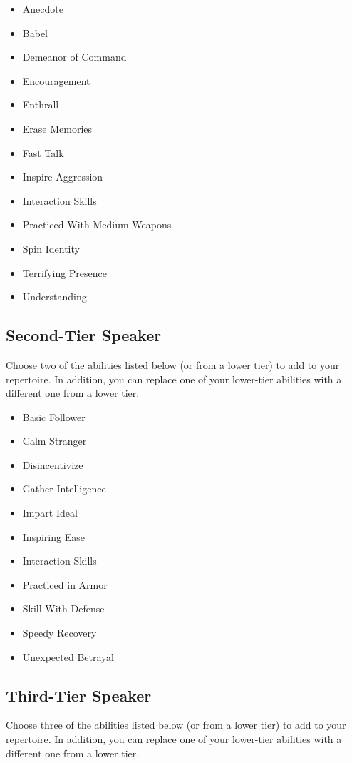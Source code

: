 \begin{itemize}
\item Anecdote
\item Babel
\item Demeanor of Command
\item Encouragement
\item Enthrall
\item Erase Memories
\item Fast Talk
\item Inspire Aggression
\item Interaction Skills
\item Practiced With Medium Weapons 
\item Spin Identity
\item Terrifying Presence
\item Understanding
\end{itemize}

\subsection{Second-Tier Speaker}

Choose two of the abilities listed below (or from a lower tier) to add to your repertoire. In addition, you can replace one of your lower-tier abilities with a different one from a lower tier.

\begin{itemize}
\item Basic Follower
\item Calm Stranger
\item Disincentivize
\item Gather Intelligence
\item Impart Ideal
\item Inspiring Ease
\item Interaction Skills
\item Practiced in Armor
\item Skill With Defense
\item Speedy Recovery
\item Unexpected Betrayal
\end{itemize}

\subsection{Third-Tier Speaker}

Choose three of the abilities listed below (or from a lower tier) to add to your repertoire. In addition, you can replace one of your lower-tier abilities with a different one from a lower tier.

